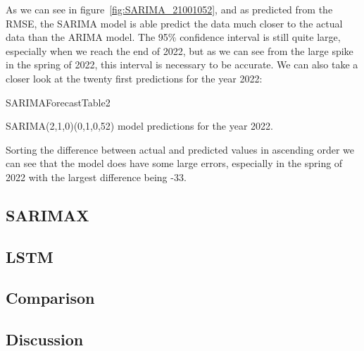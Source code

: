 As we can see in figure~\ref{fig:SARIMA_21001052}, and as predicted from the RMSE, the SARIMA model is able predict the data much closer to the actual data than the ARIMA model. The 95\% confidence interval is still quite large, especially when we reach the end of 2022, but as we can see from the large spike in the spring of 2022, this interval is necessary to be accurate. We can also take a closer look at the twenty first predictions for the year 2022:
\begin{table}[H]
    \begin{center}
        {SARIMAForecastTable2}
        \caption{SARIMA(2,1,0)(0,1,0,52) model predictions for the year 2022.}\label{tab:SARIMA_forecast}
    \end{center}
\end{table}
Sorting the difference between actual and predicted values in ascending order we can see that the model does have some large errors, especially in the spring of 2022 with the largest difference being -33.
\subsection{SARIMAX}\label{sec:sarimax}

\subsection{LSTM}\label{sec:lstm}

\subsection{Comparison}\label{sec:comparison}

\subsection{Discussion}\label{sec:discussion}